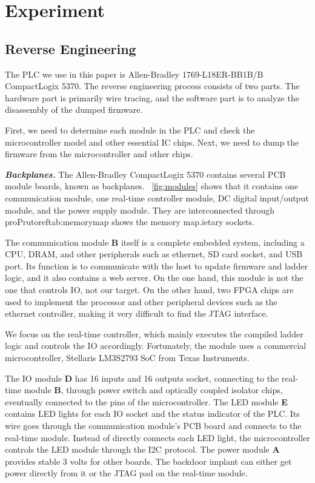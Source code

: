 \section{Experiment}
\label{sec:experiment}

\subsection{Reverse Engineering}
The PLC we use in this paper is Allen-Bradley 1769-L18ER-BB1B/B CompactLogix 5370. The reverse engineering process consists of two parts. The hardware part is primarily wire tracing, and the software part is to analyze the disassembly of the dumped firmware.

First, we need to determine each module in the PLC and check the microcontroller model and other essential IC chips. Next, we need to dump the firmware from the microcontroller and other chips.

\textbf{\textit{Backplanes.}} The Allen-Bradley CompactLogix 5370 contains several PCB module boards, known as backplanes. ~\autoref{fig:modules} shows that it contains one communication module, one real-time controller module, DC digital input/output module, and the power supply module. They are interconnected through proPrutoref{tab:memorymap} shows the memory map.ietary sockets.

The communication module \textbf{B} itself is a complete embedded system, including a CPU, DRAM, and other peripherals such as ethernet, SD card socket, and USB port. Its function is to communicate with the host to update firmware and ladder logic, and it also contains a web server. On the one hand, this module is not the one that controls IO, not our target. On the other hand, two FPGA chips are used to implement the processor and other peripheral devices such as the ethernet controller, making it very difficult to find the JTAG interface.

We focus on the real-time controller, which mainly executes the compiled ladder logic and controls the IO accordingly. Fortunately, the module uses a commercial microcontroller, Stellaris LM3S2793 SoC from Texas Instruments.

The IO module \textbf{D} has 16 inputs and 16 outputs socket, connecting to the real-time module \textbf{B}, through power switch and optically coupled isolator chips, eventually connected to the pins of the microcontroller. The LED module \textbf{E} contains LED lights for each IO socket and the status indicator of the PLC. Its wire goes through the communication module's PCB board and connects to the real-time module. Instead of directly connects each LED light, the microcontroller controls the LED module through the I2C protocol. The power module \textbf{A} provides stable 3 volts for other boards. The backdoor implant can either get power directly from it or the JTAG pad on the real-time module.

